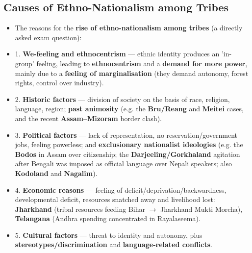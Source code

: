 \subsection{Causes of Ethno-Nationalism among Tribes}

\begin{KeyConcept}
\begin{itemize}
\item The reasons for the \textbf{rise of ethno-nationalism among tribes} (a directly asked exam question):
\item 1. \textbf{We-feeling and ethnocentrism} --- ethnic identity produces an 'in-group' feeling, leading to \textbf{ethnocentrism} and a \textbf{demand for more power}, mainly due to a \textbf{feeling of marginalisation} (they demand autonomy, forest rights, control over industry).
\item 2. \textbf{Historic factors} --- division of society on the basis of race, religion, language, region; \textbf{past animosity} (e.g. the \textbf{Bru/Reang} and \textbf{Meitei} cases, and the recent \textbf{Assam--Mizoram} border clash).
\item 3. \textbf{Political factors} --- lack of representation, no reservation/government jobs, feeling powerless; and \textbf{exclusionary nationalist ideologies} (e.g. the \textbf{Bodos} in Assam over citizenship; the \textbf{Darjeeling/Gorkhaland} agitation after Bengali was imposed as official language over Nepali speakers; also \textbf{Kodoland} and \textbf{Nagalim}).
\item 4. \textbf{Economic reasons} --- feeling of deficit/deprivation/backwardness, developmental deficit, resources snatched away and livelihood lost: \textbf{Jharkhand} (tribal resources feeding Bihar $\rightarrow$ Jharkhand Mukti Morcha), \textbf{Telangana} (Andhra spending concentrated in Rayalaseema).
\item 5. \textbf{Cultural factors} --- threat to identity and autonomy, plus \textbf{stereotypes/discrimination} and \textbf{language-related conflicts}.
\end{itemize}
\end{KeyConcept}

